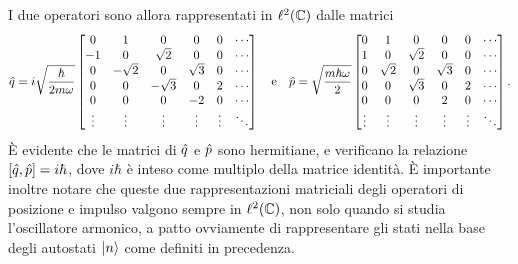 I due operatori sono allora rappresentati in $\ell^2(\mathbb{C})$ dalle matrici
\begin{equation}
	\hat{q}=i\sqrt{\frac{\hbar}{2m\omega}}
	\begin{bmatrix}
		0		&1			&0			&0			&0		&\cdots\\
		-1		&0			&\sqrt{2}	&0			&0		&\cdots\\
		0		&-\sqrt{2}	&0			&\sqrt{3}	&0		&\cdots\\
		0		&0			&-\sqrt{3}	&0			&2		&\cdots\\
		0		&0			&0			&-2			&0		&\cdots\\
		\vdots	&\vdots		&\vdots		&\vdots		&\vdots	&\ddots
	\end{bmatrix}
	\quad\text{e}\quad
	\hat{p}=\sqrt{\frac{m\hbar\omega}2}
	\begin{bmatrix}
		0		&1			&0			&0			&0		&\cdots\\
		1		&0			&\sqrt{2}	&0			&0		&\cdots\\
		0		&\sqrt{2}	&0			&\sqrt{3}	&0		&\cdots\\
		0		&0			&\sqrt{3}	&0			&2		&\cdots\\
		0		&0			&0			&2			&0		&\cdots\\
		\vdots	&\vdots		&\vdots		&\vdots		&\vdots	&\ddots
	\end{bmatrix}.
	\label{eq:matrici-posizione-impulso}
\end{equation}
È evidente che le matrici di $\hat{q}$ e $\hat{p}$ sono hermitiane, e verificano la relazione $[\hat{q},\hat{p}]=i\hbar$, dove $i\hbar$ è inteso come multiplo della matrice identità.
È importante inoltre notare che queste due rappresentazioni matriciali degli operatori di posizione e impulso valgono sempre in $\ell^2(\mathbb{C})$, non solo quando si studia l'oscillatore armonico, a patto ovviamente di rappresentare gli stati nella base degli autostati $\lvert n\rangle$ come definiti in precedenza.

